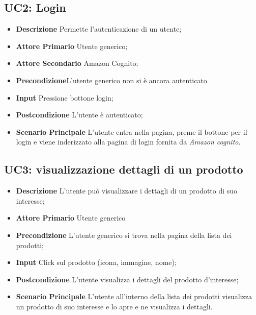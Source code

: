         \subsection{UC2: Login}
        \begin{itemize}
            \item \textbf{Descrizione} Permette l'autenticazione di un utente;
            \item \textbf{Attore Primario} Utente generico;
            \item \textbf{Attore Secondario} Amazon Cognito;
            \item \textbf{Precondizione}L'utente generico non si è ancora autenticato
            \item \textbf{Input} Pressione bottone login;
            \item \textbf{Postcondizione} L'utente è autenticato;
            \item \textbf{Scenario Principale} L'utente entra nella pagina, preme il bottone per il login e viene inderizzato alla pagina di login fornita da \textit{Amazon cognito}.
        \end{itemize}
        \subsection{UC3: visualizzazione dettagli di un prodotto}
        \begin{itemize}
            \item \textbf{Descrizione} L'utente può visualizzare i dettagli di un prodotto di suo interesse;
            \item \textbf{Attore Primario} Utente generico
            \item \textbf{Precondizione} L'utente generico si trova nella pagina della lista dei prodotti;
            \item \textbf{Input} Click sul prodotto (icona, immagine, nome);
            \item \textbf{Postcondizione} L'utente visualizza i dettagli del prodotto d'interesse;
            \item \textbf{Scenario Principale} L'utente all'interno della lista dei prodotti visualizza un prodotto di suo interesse e lo apre e ne visualizza i dettagli.
        \end{itemize}
